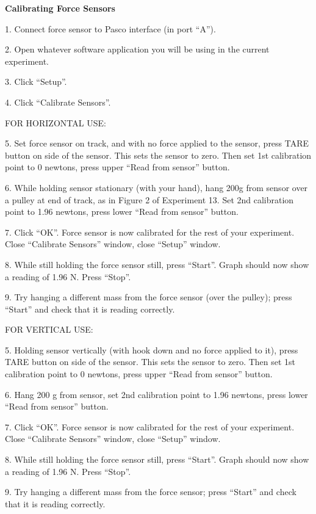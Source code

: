 \newpage


\textbf{Calibrating Force Sensors}

1. Connect force sensor to Pasco interface (in port ``A'').

2. Open whatever software application you will be using in the current experiment.

3. Click ``Setup''.

4. Click ``Calibrate Sensors''.

FOR HORIZONTAL USE:

5. Set force sensor on track, and with no force applied to the sensor, press TARE button on side of the sensor. This sets the sensor to zero. Then set 1st calibration point to 0 newtons, press upper ``Read from sensor'' button.

6. While holding sensor stationary (with your hand), hang 200g from sensor over a pulley at end of track, as in Figure 2 of Experiment 13. Set 2nd calibration point to 1.96 newtons, press lower ``Read from sensor'' button.

7. Click ``OK''. Force sensor is now calibrated for the rest of your experiment. Close ``Calibrate Sensors'' window, close ``Setup'' window.

8. While still holding the force sensor still, press ``Start''. Graph should now show a reading of 1.96 N. Press ``Stop''.

9. Try hanging a different mass from the force sensor (over the pulley); press ``Start'' and check that it is reading correctly.

FOR VERTICAL USE:

5. Holding sensor vertically (with hook down and no force applied to it), press TARE button on side of the sensor. This sets the sensor to zero. Then set 1st calibration point to 0 newtons, press upper ``Read from sensor'' button.

6. Hang 200 g from sensor, set 2nd calibration point to 1.96 newtons, press lower ``Read from sensor'' button.

7. Click ``OK''. Force sensor is now calibrated for the rest of your experiment. Close ``Calibrate Sensors'' window, close ``Setup'' window.

8. While still holding the force sensor still, press ``Start''. Graph should now show a reading of 1.96 N. Press ``Stop''.

9. Try hanging a different mass from the force sensor; press ``Start'' and check that it is reading correctly.

